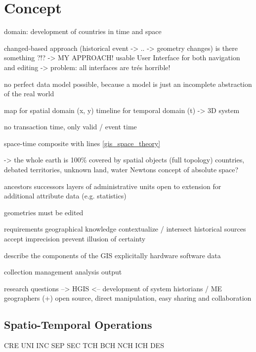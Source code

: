 
\chapter{Concept} %
\label{cha:concept}

domain: development of countries in time and space

changed-based approach (historical event -> .. -> geometry changes)
  is there something ?!?
  -> MY APPROACH!
usable User Interface for both navigation and editing
-> problem: all interfaces are trés horrible!

no perfect data model possible, because a model is just an incomplete abstraction of the real world

map for spatial domain (x, y)
timeline for temporal domain (t)
-> 3D system

no transaction time, only valid / event time

space-time composite with lines
\ref{gis_space_theory}

-> the whole earth is 100\% covered by spatial objects (full topology)
  countries, debated territories, unknown land, water
  Newtons concept of absolute space?

ancestors successors
layers of administrative units
open to extension for additional attribute data (e.g. statistics)

geometries must be edited

requirements
  geographical knowledge
  contextualize / intersect historical sources
  accept imprecision
  prevent illusion of certainty

describe the components of the GIS explicitally
 hardware
 software
 data

 collection
 management
 analysis
 output


research questions --> HGIS <-- development of system
  historians /                           ME
  geographers
(+) open source, direct manipulation, easy sharing and collaboration




\section{Spatio-Temporal Operations} %
\label{sec:spatio_temporal_operations}

CRE
UNI
INC
SEP
SEC
TCH
BCH
NCH
ICH
DES



